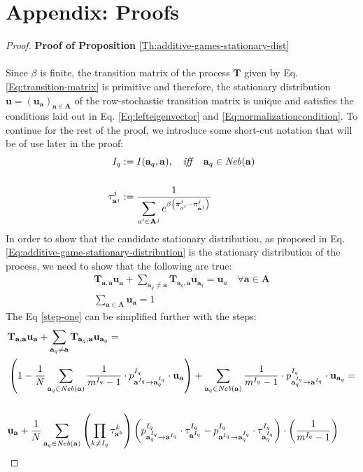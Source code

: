 \documentclass[11pt]{article}
\theoremstyle{plainCl1}
\theoremstyle{plainCl2}
\newcommand{\A}{\mathbf{A}}
\newcommand{\abf}{\mathbf{a}}
\newcommand{\T}{\mathbf{T}}
\newcommand{\ubf}{\mathbf{u}}
\begin{document}
\section*{Appendix: Proofs}
\label{Section:Appendix}
\begin{proof}
\textbf{Proof of Proposition} \ref{Th:additive-games-stationary-dist} \\ \\ 
Since $\beta$ is finite, the transition matrix of the process $\T$ given by Eq. \ref{Eq:transition-matrix} is primitive and therefore, the stationary distribution $\ubf = (\ubf_\abf)_{\abf \in \A}$ of the row-stochastic transition matrix is unique and satisfies the conditions laid out in Eq. \ref{Eq:lefteigenvector} and \ref{Eq:normalizationcondition}. To continue for the rest of the proof, we introduce some short-cut notation that will be of use later in the proof:\\
\begin{align}
I_{q} &:= I(\abf_q,\abf), \quad \mathit{iff} \quad \abf_q \in \mathit{Neb}(\abf) \\ \notag \\ 
\label{Eq:shortcut-tau}
\tau^j_{\abf^j} &:= \frac{1}{\displaystyle \sum_{a' \in \A^j} e^{\beta \left( \pi^j_{a'} -  \pi^j_{\abf^j} \right) }} 
\end{align}
\noindent In order to show that the candidate stationary distribution, as proposed in Eq. \ref{Eq:additive-game-stationary-distribution} is the stationary distribution of the process, we need to show that the following are true:
\begin{eqnarray}
\label{step-one}
\T_{\abf,\abf} \ubf_\abf  + \sum_{\abf_q \neq \abf} \T_{\abf_q, \abf} \ubf_{\abf_q}= \ubf_a \quad \forall \abf \in \A \\ 
\label{step-two}
\sum_{\abf \in \A} \ubf_\abf  = 1
\end{eqnarray}
The Eq \ref{step-one} can be simplified further with the steps: 
\begin{align}
&\T_{\abf,\abf} \ubf_\abf  + \sum_{\abf_q \neq \abf} \T_{\abf_q, \abf} \ubf_{\abf_q}= \\
& \left( 1 - \frac{1}{N} \sum_{\abf_q \in \mathit{Neb}(\abf)} \frac{1}{m^{I_q}-1} \cdot p^{I_q}_{\abf^{I_q} \to \abf^{I_q}_q} \cdot \ubf_{\abf} \right) + \sum_{\abf_q \in \mathit{Neb}(\abf)}  \frac{1}{m^{I_q}-1} \cdot p^{I_q}_{\abf^{I_q}_q \to \abf^{I_q}} \cdot \ubf_{\abf_q} = \\ \notag \\
\label{eq:important-step}
& \ubf_\abf +  \frac{1}{N} \sum_{\abf_q \in \mathit{Neb}(\abf)} \left( \prod_{k \neq I_q} \tau^k_{\abf^k} \right) \left( p^{I_q}_{\abf^{I_q}_q \to \abf^{I_q}} \cdot \tau^{I_q}_{\abf^{I_q}} -  p^{I_q}_{\abf^{I_q} \to \abf^{I_q}_q} \cdot \tau^{I_q}_{\abf^{I_q}_q} \right) \cdot \left(  \frac{1}{m^{I_q}-1} \right)

\end{align}
\end{proof}
\end{document}
